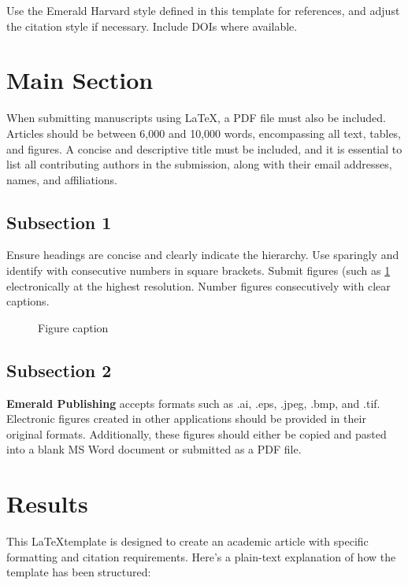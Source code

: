 \documentclass{article}
\begin{document}
Use the Emerald Harvard style defined in this template for references, and adjust the citation style if necessary. Include DOIs where available. 

\section{Main Section}
\label{sec:main_section}
When submitting manuscripts using \LaTeX, a PDF file must also be included. 
Articles should be between 6,000 and 10,000 words, encompassing all text, tables, and figures. 
A concise and descriptive title must be included, and it is essential to list all contributing authors in the submission, along with their email addresses, names, and affiliations.



\subsection{Subsection 1}
Ensure headings are concise and clearly indicate the hierarchy. 
Use sparingly and identify with consecutive numbers in square brackets.
Submit figures (such as \cref{fig-1} electronically at the highest resolution. Number figures consecutively with clear captions.

\begin{figure}[ht]
 \centering
 \caption{Figure caption}
 \label{fig-1}
\end{figure}


\subsection{Subsection 2}

\textbf{Emerald Publishing} accepts formats such as .ai, .eps, .jpeg, .bmp, and .tif. Electronic figures created in other applications should be provided in their original formats. 
Additionally, these figures should either be copied and pasted into a blank MS Word document or submitted as a PDF file.

\section{Results}
\label{sec:modelling}
This \LaTeX template is designed to create an academic article with specific formatting and citation requirements. Here's a plain-text explanation of how the template has been structured:
\end{document}
